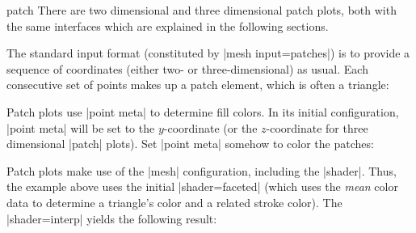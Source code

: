{\begin{plottype}[/pgfplots]{patch}
    There are two dimensional and three dimensional patch plots, both with the
    same interfaces which are explained in the following sections.

    The standard input format (constituted by |mesh input=patches|) is to
    provide a sequence of coordinates (either two- or three-dimensional) as
    usual. Each consecutive set of points makes up a patch element, which is
    often a triangle:
\begin{codeexample}[]
\end{codeexample}
    \noindent Patch plots use |point meta| to determine fill colors. In its
    initial configuration, |point meta| will be set to the $y$-coordinate (or
    the $z$-coordinate for three dimensional |patch| plots). Set |point meta|
    somehow to color the patches:
\begin{codeexample}[]
\end{codeexample}
    Patch plots make use of the |mesh| configuration, including the |shader|.
    Thus, the example above uses the initial |shader=faceted| (which uses the
    \emph{mean} color data to determine a triangle's color and a related stroke
    color). The |shader=interp| yields the following result:
\begin{codeexample}[]
\end{codeexample}
\end{plottype}}
